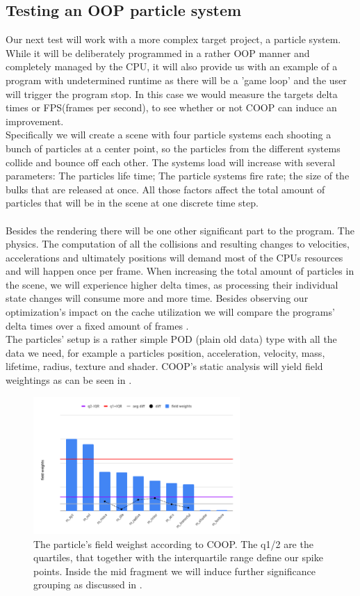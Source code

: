 \subsection{Testing an OOP particle system}
Our next test will work with a more complex target project, a particle system. While it will be deliberately programmed in a rather OOP manner and completely managed by the CPU, it will also provide us with an example of a program with undetermined runtime as there will be a 'game loop' and the user will trigger the program stop. In this case we would measure the targets delta times or FPS(frames per second), to see whether or not COOP can induce an improvement.\\
Specifically we will create a scene with four particle systems each shooting a bunch of particles at a center point, so the particles from the different systems collide and bounce off each other. The systems load will increase with several parameters: The particles life time; The particle systems fire rate; the size of the bulks that are released at once. All those factors affect the total amount of particles that will be in the scene at one discrete time step.\\\\
Besides the rendering there will be one other significant part to the program. The physics. The computation of all the collisions and resulting changes to velocities, accelerations and ultimately positions will demand most of the CPUs resources and will happen once per frame. When increasing the total amount of particles in the scene, we will experience higher delta times, as processing their individual state changes will consume more and more time. Besides observing our optimization's impact on the cache utilization we will compare the programs' delta times over a fixed amount of frames .\\
The particles' setup is a rather simple POD (plain old data) type with all the data we need, for example a particles position, acceleration, velocity, mass, lifetime, radius, texture and shader. COOP's static analysis will yield field weightings as can be seen in .
\begin{figure}[!htbp]
	\centering
	\includegraphics[width=0.7\textwidth,height=0.5\textwidth]{PICs/particle_field_weights}
	\caption{The particle's field weighst according to COOP. The q1/2 are the quartiles, that together with the interquartile range define our spike points. Inside the mid fragment we will induce further significance grouping as discussed in .}
	\label{particle_field_weights}
\end{figure}
